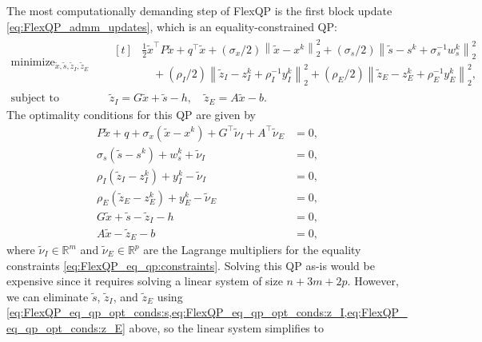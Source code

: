 \documentclass{article} %
\def\sR{{\mathbb{R}}}
\DeclareMathOperator*{\minimize}{minimize}
\DeclareMathOperator*{\st}{subject\ to}
\newcommand{\norm}[1]{\left\lVert#1\right\rVert}
\begin{document}
The most computationally demanding step of FlexQP is the first block update \cref{eq:FlexQP_admm_updates}, which is an equality-constrained QP:
\begin{subequations} \label{eq:FlexQP_eq_qp}
\begin{align}
    \minimize_{\tilde{x}, \tilde{s}, \tilde{z}_I, \tilde{z}_E} \quad & \begin{aligned}[t]
        & \frac{1}{2} \tilde{x}^\top P \tilde{x} + q^\top \tilde{x} + (\sigma_x/2)\norm{\tilde{x} - x^k}_2^2 + (\sigma_s/2)\norm{\tilde{s} - s^k + \sigma_s^{-1} w_s^k}_2^2 \\
        & \quad + (\rho_I/2)\norm{\tilde{z}_I - z_I^k + \rho_I^{-1} y_I^k}_2^2 + (\rho_E/2)\norm{\tilde{z}_E - z_E^k + \rho_E^{-1} y_E^k}_2^2,
    \end{aligned}  \label{eq:FlexQP_eq_qp:obj} \\
    \st \quad & \tilde{z}_I = G \tilde{x} + \tilde{s} - h, \quad \tilde{z}_E = A \tilde{x} - b.  \label{eq:FlexQP_eq_qp:constraints}
\end{align}
\end{subequations}
The optimality conditions for this QP are given by
\begin{subequations}  \label{eq:FlexQP_eq_qp_opt_conds}
\begin{align}
    P \tilde{x} + q + \sigma_x(\tilde{x} - x^k) + G^\top \tilde{\nu}_I + A^\top \tilde{\nu}_E &= 0,  \label{eq:FlexQP_eq_qp_opt_conds:x} \\
    \sigma_s(\tilde{s} - s^k) + w_s^k + \tilde{\nu}_I &= 0,  \label{eq:FlexQP_eq_qp_opt_conds:s} \\
    \rho_I(\tilde{z}_I - z_I^k) + y_I^k - \tilde{\nu}_I &= 0,  \label{eq:FlexQP_eq_qp_opt_conds:z_I} \\
    \rho_E(\tilde{z}_E - z_E^k) + y_E^k - \tilde{\nu}_E &= 0,  \label{eq:FlexQP_eq_qp_opt_conds:z_E} \\
    G \tilde{x} + \tilde{s} - \tilde{z}_I - h &= 0,  \label{eq:FlexQP_eq_qp_opt_conds:nu_I} \\
    A \tilde{x} - \tilde{z}_E - b &= 0,  \label{eq:FlexQP_eq_qp_opt_conds:nu_E}
\end{align}
\end{subequations}
where $\tilde{\nu}_I \in \sR^m$ and $\tilde{\nu}_E \in \sR^p$ are the Lagrange multipliers for the equality constraints \cref{eq:FlexQP_eq_qp:constraints}. Solving this QP as-is would be expensive since it requires solving a linear system of size $n + 3m + 2p$. However, we can eliminate $\tilde{s}$, $\tilde{z}_I$, and $\tilde{z}_E$ using \cref{eq:FlexQP_eq_qp_opt_conds:s,eq:FlexQP_eq_qp_opt_conds:z_I,eq:FlexQP_eq_qp_opt_conds:z_E} above, so the linear system simplifies to
\end{document}
